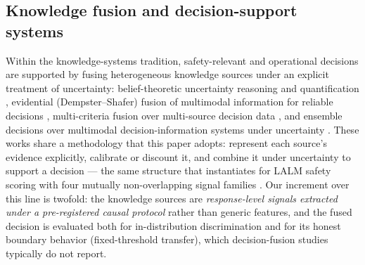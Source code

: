 \subsection{Knowledge fusion and decision-support systems}
Within the knowledge-systems tradition, safety-relevant and operational
decisions are supported by fusing heterogeneous knowledge sources under an
explicit treatment of uncertainty: belief-theoretic uncertainty reasoning and
quantification \citep{guo2024survey}, evidential (Dempster--Shafer) fusion of
multimodal information for reliable decisions \citep{shao2024duallevel},
multi-criteria fusion over multi-source decision data \citep{xu2025promethee},
and ensemble decisions over multimodal decision-information systems under
uncertainty \citep{zhao2025ensemble}. These works share a methodology that
this paper adopts: represent each source's evidence explicitly, calibrate or
discount it, and combine it under uncertainty to support a decision --- the
same structure that \MSRF{} instantiates for LALM safety scoring with four
mutually non-overlapping signal families \citep{shafer1976}. Our increment
over this line is twofold: the knowledge sources are \emph{response-level
signals extracted under a pre-registered causal protocol} rather than generic
features, and the fused decision is evaluated both for in-distribution
discrimination and for its honest boundary behavior (fixed-threshold
transfer), which decision-fusion studies typically do not report.
